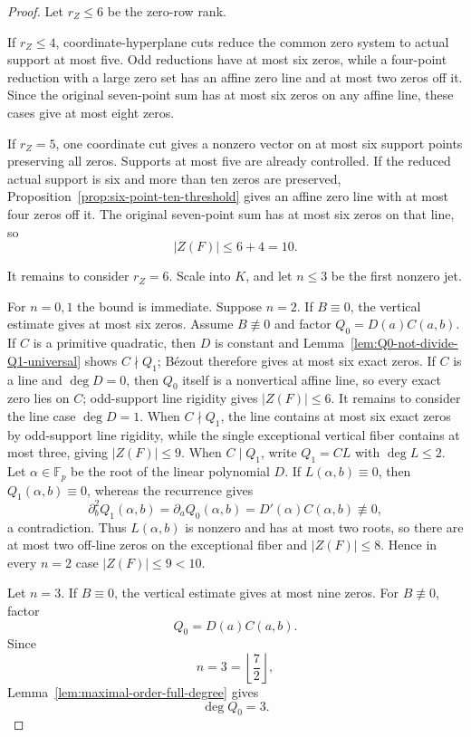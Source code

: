 \documentclass[11pt]{article}
\newcommand{\F}{\mathbb F}
\begin{document}
\begin{proof}
Let \(r_Z\le6\) be the zero-row rank.

If \(r_Z\le4\), coordinate-hyperplane cuts reduce the common zero
system to actual support at most five.  Odd reductions have at most
six zeros, while a four-point reduction with a large zero set has an
affine zero line and at most two zeros off it.  Since the original
seven-point sum has at most six zeros on any affine line, these cases
give at most eight zeros.

If \(r_Z=5\), one coordinate cut gives a nonzero vector on at most six
support points preserving all zeros.  Supports at most five are
already controlled.  If the reduced actual support is six and more
than ten zeros are preserved,
Proposition~\ref{prop:six-point-ten-threshold} gives an affine zero
line with at most four zeros off it.  The original seven-point sum has
at most six zeros on that line, so
\[
 |Z(F)|\le6+4=10.
\]

It remains to consider \(r_Z=6\).  Scale into \(K\), and let \(n\le3\)
be the first nonzero jet.

For \(n=0,1\) the bound is immediate.  Suppose \(n=2\).  If
\(B\equiv0\), the vertical estimate gives at most six zeros.  Assume
\(B\not\equiv0\) and factor \(Q_0=D(a)C(a,b)\).  If \(C\) is a
primitive quadratic, then \(D\) is constant and
Lemma~\ref{lem:Q0-not-divide-Q1-universal} shows \(C\nmid Q_1\); B\'ezout
therefore gives at most six exact zeros.  If \(C\) is a line and
\(\deg D=0\), then \(Q_0\) itself is a nonvertical affine line, so every
exact zero lies on \(C\); odd-support line rigidity gives
\(|Z(F)|\le6\).  It remains to consider the line case \(\deg D=1\).
When \(C\nmid Q_1\), the line contains at most six exact zeros by
odd-support line rigidity, while the single exceptional vertical fiber
contains at most three, giving \(|Z(F)|\le9\).  When \(C\mid Q_1\), write
\(Q_1=CL\) with \(\deg L\le2\).  Let \(\alpha\in\F_p\) be the root of
the linear polynomial \(D\).  If
\(L(\alpha,b)\equiv0\), then \(Q_1(\alpha,b)\equiv0\), whereas the
recurrence gives
\[
 \partial_b^2Q_1(\alpha,b)
 =\partial_aQ_0(\alpha,b)
 =D'(\alpha)C(\alpha,b)\not\equiv0,
\]
a contradiction.  Thus \(L(\alpha,b)\) is nonzero and has at most two
roots, so there are at most two off-line zeros on the exceptional fiber and
\(|Z(F)|\le8\).  Hence in every \(n=2\) case
\(|Z(F)|\le9<10\).

Let \(n=3\).  If \(B\equiv0\), the vertical estimate gives at most nine
zeros.  For \(B\not\equiv0\), factor
\[
 Q_0=D(a)C(a,b).
\]
Since
\[
 n=3=\left\lfloor\frac72\right\rfloor,
\]
Lemma~\ref{lem:maximal-order-full-degree} gives
\[
 \deg Q_0=3.
\]


\end{proof}
\end{document}
